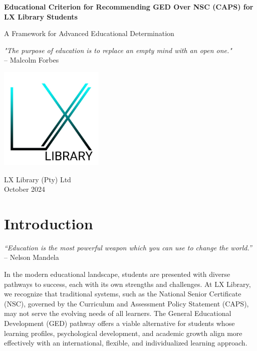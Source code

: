 \documentclass[12pt]{article}
\begin{document}
\begin{titlepage}
    \centering
    \vspace*{2cm}
    
    {\Huge \textbf{Educational Criterion for Recommending GED Over NSC (CAPS) for LX Library Students}}
    
    \vspace{0.5cm}
    
    {\Large A Framework for Advanced Educational Determination}
    
    \vspace{1.5cm}
    
    \textit{"The purpose of education is to replace an empty mind with an open one."} \\
    \vspace{0.3cm}
    -- Malcolm Forbes
    
    \vfill
    
    \includegraphics[width=5cm]{logo.jpg}
    
    \vspace{0.8cm}
    
    {\Large LX Library (Pty) Ltd\\ October 2024}
    
    \vfill
\end{titlepage}

\newpage
\tableofcontents
\newpage

\section{Introduction}
\textit{“Education is the most powerful weapon which you can use to change the world.”} -- Nelson Mandela

In the modern educational landscape, students are presented with diverse pathways to success, each with its own strengths and challenges. At LX Library, we recognize that traditional systems, such as the National Senior Certificate (NSC), governed by the Curriculum and Assessment Policy Statement (CAPS), may not serve the evolving needs of all learners. The General Educational Development (GED) pathway offers a viable alternative for students whose learning profiles, psychological development, and academic growth align more effectively with an international, flexible, and individualized learning approach.
\end{document}
